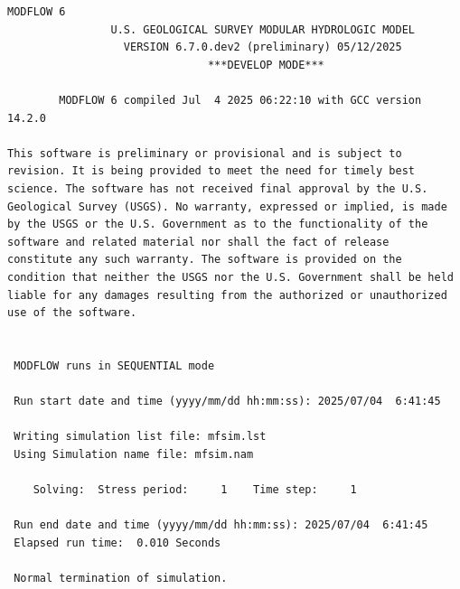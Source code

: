 {\small
\begin{lstlisting}[style=modeloutput]
                                   MODFLOW 6
                U.S. GEOLOGICAL SURVEY MODULAR HYDROLOGIC MODEL
                  VERSION 6.7.0.dev2 (preliminary) 05/12/2025
                               ***DEVELOP MODE***

        MODFLOW 6 compiled Jul  4 2025 06:22:10 with GCC version 14.2.0

This software is preliminary or provisional and is subject to 
revision. It is being provided to meet the need for timely best 
science. The software has not received final approval by the U.S. 
Geological Survey (USGS). No warranty, expressed or implied, is made 
by the USGS or the U.S. Government as to the functionality of the 
software and related material nor shall the fact of release 
constitute any such warranty. The software is provided on the 
condition that neither the USGS nor the U.S. Government shall be held 
liable for any damages resulting from the authorized or unauthorized 
use of the software.


 MODFLOW runs in SEQUENTIAL mode

 Run start date and time (yyyy/mm/dd hh:mm:ss): 2025/07/04  6:41:45

 Writing simulation list file: mfsim.lst
 Using Simulation name file: mfsim.nam

    Solving:  Stress period:     1    Time step:     1

 Run end date and time (yyyy/mm/dd hh:mm:ss): 2025/07/04  6:41:45
 Elapsed run time:  0.010 Seconds

 Normal termination of simulation.
\end{lstlisting}
}
